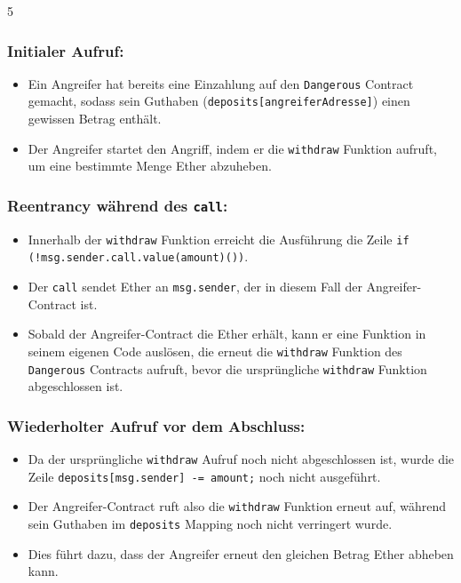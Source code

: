 \documentclass[german]{../uebung}
\begin{document}
\begin{exercise} {5}
    \subsubsection*{Initialer Aufruf:}
    \begin{itemize}
        \item Ein Angreifer hat bereits eine Einzahlung auf den \texttt{Dangerous} Contract gemacht, sodass sein Guthaben (\texttt{deposits[angreiferAdresse]}) einen gewissen Betrag enthält.
        \item Der Angreifer startet den Angriff, indem er die \texttt{withdraw} Funktion aufruft, um eine bestimmte Menge Ether abzuheben.
    \end{itemize}

    \subsubsection*{Reentrancy während des \texttt{call}:}
    \begin{itemize}
        \item Innerhalb der \texttt{withdraw} Funktion erreicht die Ausführung die Zeile \texttt{if (!msg.sender.call.value(amount)())}.
        \item Der \texttt{call} sendet Ether an \texttt{msg.sender}, der in diesem Fall der Angreifer-Contract ist.
        \item Sobald der Angreifer-Contract die Ether erhält, kann er eine Funktion in seinem eigenen Code auslösen, die erneut die \texttt{withdraw} Funktion des \texttt{Dangerous} Contracts aufruft, bevor die ursprüngliche \texttt{withdraw} Funktion abgeschlossen ist.
    \end{itemize}

    \subsubsection*{Wiederholter Aufruf vor dem Abschluss:}
    \begin{itemize}
        \item Da der ursprüngliche \texttt{withdraw} Aufruf noch nicht abgeschlossen ist, wurde die Zeile \texttt{deposits[msg.sender] -= amount;} noch nicht ausgeführt.
        \item Der Angreifer-Contract ruft also die \texttt{withdraw} Funktion erneut auf, während sein Guthaben im \texttt{deposits} Mapping noch nicht verringert wurde.
        \item Dies führt dazu, dass der Angreifer erneut den gleichen Betrag Ether abheben kann.
    \end{itemize}


\end{exercise}
\end{document}

